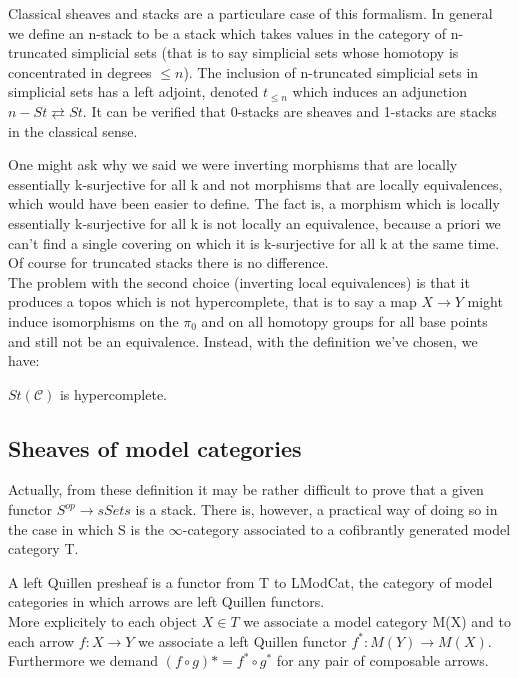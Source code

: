 \begin{rmk}
Classical sheaves and stacks are a particulare case of this formalism. In general we define an n-stack to be a stack which takes values in the category of n-truncated
simplicial sets (that is to say simplicial sets whose homotopy is concentrated in degrees $\le n$). The inclusion of n-truncated simplicial sets in simplicial sets has a left 
adjoint, denoted $t_{\le n}$ which induces an adjunction $n-St\rightleftarrows St$. It can be verified that 0-stacks are sheaves and 1-stacks are stacks in the classical sense.
\end{rmk}

One might ask why we said we were inverting morphisms that are locally essentially k-surjective for all k and not morphisms that are locally equivalences, which would have been easier to define.
The fact is, a morphism which is locally essentially k-surjective for all k is not locally an equivalence, because a priori we can't find a single covering on which it
is k-surjective for all k at the same time. Of course for truncated stacks there is no difference.\\
The problem with the second choice (inverting local equivalences) is that it produces a topos which is not hypercomplete, that is to say a map $X\to Y$ might induce
isomorphisms on the $\pi_0$ and on all homotopy groups for all base points and still not be an equivalence. Instead, with the definition we've chosen, we have:

\begin{prop}
$St(\mathcal C)$ is hypercomplete.
\end{prop}


\subsection{Sheaves of model categories}

Actually, from these definition it may be rather difficult to prove that a given functor $S^{op}\to sSets$ is a stack. There is, however, a practical way of doing so
 in the case in which S is the $\infty$-category associated to a cofibrantly generated model category T.
\begin{defin}
A left Quillen presheaf is a functor from T to LModCat, the category of model categories in which arrows are left Quillen functors.\\
More explicitely to each object $X\in T$ we associate a model category M(X) and to each arrow $f:X\to Y$ we associate a left Quillen functor $f^*:M(Y)\to M(X)$.\\
Furthermore we demand $(f\circ g)*=f^*\circ g^*$ for any pair of composable arrows.
\end{defin}

